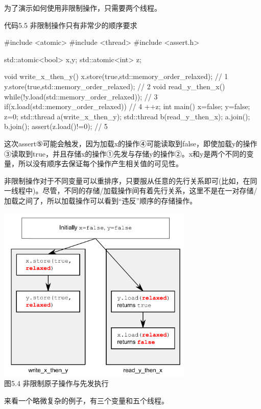 为了演示如何使用非限制操作，只需要两个线程。

代码5.5 非限制操作只有非常少的顺序要求

\begin{cpp}
#include <atomic>
#include <thread>
#include <assert.h>

std::atomic<bool> x,y;
std::atomic<int> z;

void write_x_then_y()
{
  x.store(true,std::memory_order_relaxed);  // 1
  y.store(true,std::memory_order_relaxed);  // 2
}
void read_y_then_x()
{
  while(!y.load(std::memory_order_relaxed));  // 3
  if(x.load(std::memory_order_relaxed))  // 4
    ++z;
}
int main()
{
  x=false;
  y=false;
  z=0;
  std::thread a(write_x_then_y);
  std::thread b(read_y_then_x);
  a.join();
  b.join();
  assert(z.load()!=0);  // 5
}
\end{cpp}

这次assert⑤可能会触发，因为加载x的操作④可能读取到false，即使加载y的操作③读取到true，并且存储x的操作①先发与存储y的操作②。x和y是两个不同的变量，所以没有顺序去保证每个操作产生相关值的可见性。

非限制操作对于不同变量可以重排序，只要服从任意的先行关系即可(比如，在同一线程中)。尽管，不同的存储/加载操作间有着先行关系，这里不是在一对存储/加载之间了，所以加载操作可以看到“违反”顺序的存储操作。

\begin{center}
    \includegraphics[width=0.7\textwidth]{content/chapter05/images/5-4.png}\\
    图5.4 非限制原子操作与先发执行
\end{center}

来看一个略微复杂的例子，有三个变量和五个线程。

